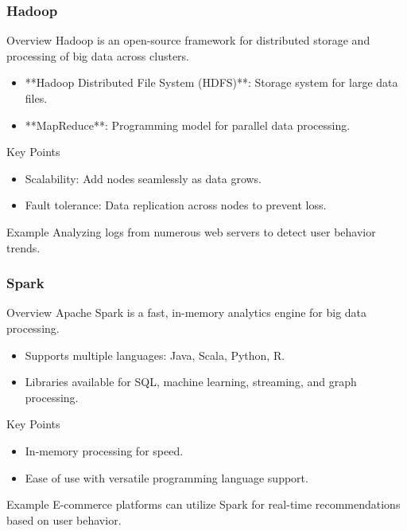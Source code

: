 \documentclass[aspectratio=169]{beamer}
\begin{document}
\begin{frame}[fragile]
    \frametitle{Hadoop}
    \begin{block}{Overview}
        Hadoop is an open-source framework for distributed storage and processing of big data across clusters.
    \end{block}
    \begin{itemize}
        \item **Hadoop Distributed File System (HDFS)**: Storage system for large data files.
        \item **MapReduce**: Programming model for parallel data processing.
    \end{itemize}
    \begin{block}{Key Points}
        \begin{itemize}
            \item Scalability: Add nodes seamlessly as data grows.
            \item Fault tolerance: Data replication across nodes to prevent loss.
        \end{itemize}
    \end{block}
    \begin{block}{Example}
        Analyzing logs from numerous web servers to detect user behavior trends.
    \end{block}
\end{frame}

\begin{frame}[fragile]
    \frametitle{Spark}
    \begin{block}{Overview}
        Apache Spark is a fast, in-memory analytics engine for big data processing.
    \end{block}
    \begin{itemize}
        \item Supports multiple languages: Java, Scala, Python, R.
        \item Libraries available for SQL, machine learning, streaming, and graph processing.
    \end{itemize}
    \begin{block}{Key Points}
        \begin{itemize}
            \item In-memory processing for speed.
            \item Ease of use with versatile programming language support.
        \end{itemize}
    \end{block}
    \begin{block}{Example}
        E-commerce platforms can utilize Spark for real-time recommendations based on user behavior.
    \end{block}
\end{frame}
\end{document}
